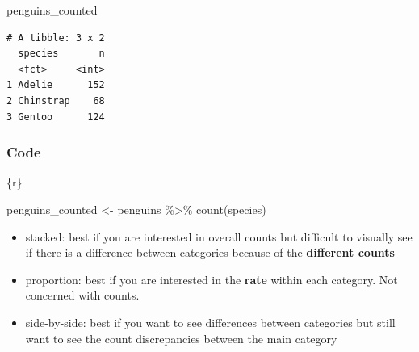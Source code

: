 \documentclass[
  letterpaper,
  DIV=11,
  numbers=noendperiod]{scrreprt}
\newenvironment{Shaded}{\begin{snugshade}}{\end{snugshade}}
\newcommand{\FunctionTok}[1]{\textcolor[rgb]{0.28,0.35,0.67}{#1}}
\newcommand{\InformationTok}[1]{\textcolor[rgb]{0.37,0.37,0.37}{#1}}
\newcommand{\NormalTok}[1]{\textcolor[rgb]{0.00,0.23,0.31}{#1}}
\newcommand{\OtherTok}[1]{\textcolor[rgb]{0.00,0.23,0.31}{#1}}
\newcommand{\SpecialCharTok}[1]{\textcolor[rgb]{0.37,0.37,0.37}{#1}}
\providecommand{\tightlist}{%
  \setlength{\itemsep}{0pt}\setlength{\parskip}{0pt}}\usepackage{longtable,booktabs,array}
\begin{document}
\begin{tcolorbox}[enhanced jigsaw, colframe=quarto-callout-note-color-frame, breakable, colback=white, toprule=.15mm, leftrule=.75mm, left=2mm, opacityback=0, rightrule=.15mm, arc=.35mm, bottomrule=.15mm]
\begin{Shaded}
\begin{Highlighting}[]
\NormalTok{penguins\_counted}
\InformationTok{\textasciigrave{}\textasciigrave{}\textasciigrave{}}
\end{Highlighting}
\end{Shaded}

\begin{verbatim}
# A tibble: 3 x 2
  species       n
  <fct>     <int>
1 Adelie      152
2 Chinstrap    68
3 Gentoo      124
\end{verbatim}

\hypertarget{code}{%
\subsubsection*{Code}\label{code}}

\begin{Shaded}
\begin{Highlighting}[]
\InformationTok{\textasciigrave{}\textasciigrave{}\textasciigrave{}\{r\}}

\NormalTok{penguins\_counted }\OtherTok{\textless{}{-}}\NormalTok{ penguins }\SpecialCharTok{\%\textgreater{}\%} 
  \FunctionTok{count}\NormalTok{(species)}
\InformationTok{\textasciigrave{}\textasciigrave{}\textasciigrave{}}
\end{Highlighting}
\end{Shaded}

\end{tcolorbox}

\begin{tcolorbox}[enhanced jigsaw, colframe=quarto-callout-important-color-frame, breakable, colback=white, toprule=.15mm, leftrule=.75mm, title={Teaching note:}, left=2mm, coltitle=black, bottomtitle=1mm, bottomrule=.15mm, rightrule=.15mm, colbacktitle=quarto-callout-important-color!10!white, opacitybacktitle=0.6, opacityback=0, toptitle=1mm, arc=.35mm, titlerule=0mm]

\begin{itemize}
\tightlist
\item
  stacked: best if you are interested in overall counts but difficult to
  visually see if there is a difference between categories because of
  the \textbf{different counts}
\item
  proportion: best if you are interested in the \textbf{rate} within
  each category. Not concerned with counts.
\item
  side-by-side: best if you want to see differences between categories
  but still want to see the count discrepancies between the main
  category
\end{itemize}

\end{tcolorbox}
\end{document}
